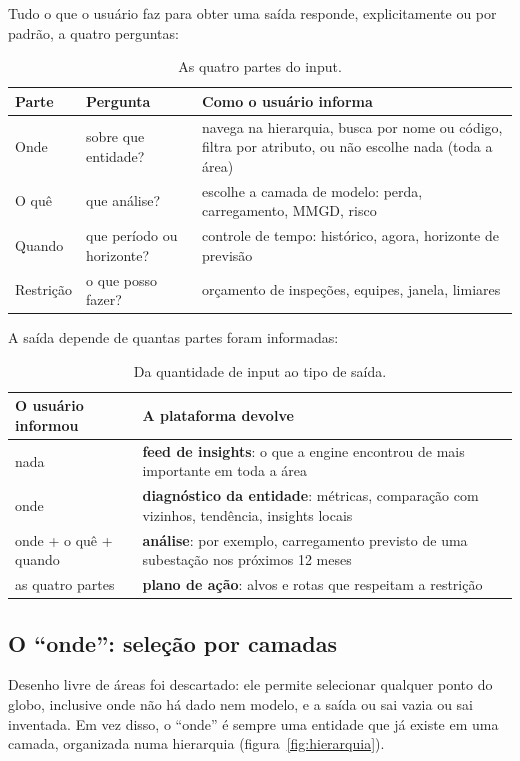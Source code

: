 \documentclass[10pt,a4paper,oneside]{article}
\begin{document}
Tudo o que o usuário faz para obter uma saída responde, explicitamente ou por
padrão, a quatro perguntas:

\begin{table}[H]
\centering
\caption{As quatro partes do input.}
\begin{tabularx}{\textwidth}{l l L}
\toprule
\textbf{Parte} & \textbf{Pergunta} & \textbf{Como o usuário informa} \\
\midrule
Onde & sobre que entidade? & navega na hierarquia, busca por nome ou
  código, filtra por atributo, ou não escolhe nada (toda a área) \\
O quê & que análise? & escolhe a camada de modelo: perda, carregamento,
  MMGD, risco \\
Quando & que período ou horizonte? & controle de tempo: histórico, agora,
  horizonte de previsão \\
Restrição & o que posso fazer? & orçamento de inspeções, equipes, janela,
  limiares \\
\bottomrule
\end{tabularx}
\end{table}

A saída depende de quantas partes foram informadas:

\begin{table}[H]
\centering
\caption{Da quantidade de input ao tipo de saída.}
\begin{tabularx}{\textwidth}{l L}
\toprule
\textbf{O usuário informou} & \textbf{A plataforma devolve} \\
\midrule
nada & \textbf{feed de insights}: o que a engine encontrou de mais
  importante em toda a área \\
onde & \textbf{diagnóstico da entidade}: métricas, comparação com vizinhos,
  tendência, insights locais \\
onde + o quê + quando & \textbf{análise}: por exemplo, carregamento previsto
  de uma subestação nos próximos 12 meses \\
as quatro partes & \textbf{plano de ação}: alvos e rotas que respeitam a
  restrição \\
\bottomrule
\end{tabularx}
\end{table}

\subsection{O ``onde'': seleção por camadas}

Desenho livre de áreas foi descartado: ele permite selecionar qualquer ponto
do globo, inclusive onde não há dado nem modelo, e a saída ou sai vazia ou sai
inventada. Em vez disso, o ``onde'' é sempre uma entidade que já existe em uma
camada, organizada numa hierarquia (figura~\ref{fig:hierarquia}).
\end{document}
